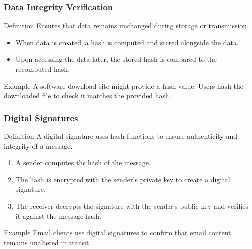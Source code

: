 \documentclass{beamer}
\begin{document}
\begin{frame}[fragile]
    \frametitle{Data Integrity Verification}
    \begin{block}{Definition}
        Ensures that data remains unchanged during storage or transmission.
    \end{block}
    \begin{itemize}
        \item When data is created, a hash is computed and stored alongside the data.
        \item Upon accessing the data later, the stored hash is compared to the recomputed hash.
    \end{itemize}
    \begin{exampleblock}{Example}
        A software download site might provide a hash value. Users hash the downloaded file to check it matches the provided hash.
    \end{exampleblock}
\end{frame}

\begin{frame}[fragile]
    \frametitle{Digital Signatures}
    \begin{block}{Definition}
        A digital signature uses hash functions to ensure authenticity and integrity of a message.
    \end{block}
    \begin{enumerate}
        \item A sender computes the hash of the message.
        \item The hash is encrypted with the sender's private key to create a digital signature.
        \item The receiver decrypts the signature with the sender's public key and verifies it against the message hash.
    \end{enumerate}
    \begin{exampleblock}{Example}
        Email clients use digital signatures to confirm that email content remains unaltered in transit.
    \end{exampleblock}
\end{frame}
\end{document}
